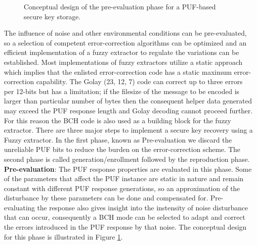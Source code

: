 \begin{figure}[htp]
\centering
{}
\caption{Conceptual design of the pre-evaluation phase for a PUF-based secure key storage.}
\label{img:fz_1}
\end{figure}
The influence of noise and other environmental conditions can be pre-evaluated, so a selection of competent error-correction algorithms can be optimized and an efficient implementation of a fuzzy extractor to regulate the variations can be established. Most implementations of fuzzy extractors utilize a static approach which implies that the enlisted error-correction code has a static maximum error-correction capability. The Golay (23, 12, 7) code can correct up to three errors per 12-bits but has a
limitation; if the filesize of the message to be encoded is larger than particular number of bytes then the consequent helper data generated may exceed the PUF response length and Golay decoding cannot proceed further. For this reason the BCH code is also used as a building block for the fuzzy extractor. There are three major steps to implement a secure key recovery using a Fuzzy extractor. In the first phase, known as Pre-evaluation we discard the unreliable PUF bits to reduce the burden on the error-correction scheme. The second phase is called generation/enrollment followed by the reproduction phase.\\

\textbf{Pre-evaluation}: The PUF response properties are evaluated in this phase. Some of the parameters that affect the PUF instance are static in nature and remain constant with different PUF response generations, so an approximation of the disturbance by these parameters can be done and compensated for. Pre-evaluating the response also gives insight into the instensity of noise disturbance that can occur, consequently a BCH mode can be selected to adapt and correct the errors introduced in the PUF response by that noise. The conceptual
design for this phase is illustrated in Figure \ref{img:fz_1}.\\

